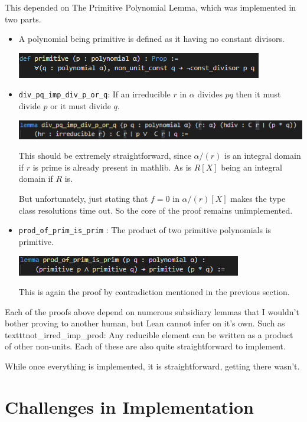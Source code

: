 \documentclass[pagesize=a4]{scrreprt}
\begin{document}
This depended on The Primitive Polynomial Lemma, which was implemented in two parts. 

\begin{itemize}
   \item A polynomial being primitive is defined as it having no constant divisors. 

   \includegraphics{def_prim.png}

   \item \texttt{div\_pq\_imp\_div\_p\_or\_q}: If an irreducible $r$ in $\alpha$ divides $pq$ then it must divide $p$ or it must divide $q$. 

    \includegraphics{div_pq.png}

    This should be extremely straightforward, since $\alpha/(r)$ is an integral domain if $r$ is prime is already present in mathlib. As is $R[X]$ being an integral domain if $R$ is.

    But unfortunately, just stating that $f = 0$ in $\alpha/(r)[X]$ makes the type class resolutions time out. So the core of the proof remains unimplemented.

    \item \texttt{prod\_of\_prim\_is\_prim} : The product of two primitive polynomials is primitive. 
    
    \includegraphics{prod_prim.png} 

    This is again the proof by contradiction mentioned in the previous section. 

\end{itemize}


Each of the proofs above depend on numerous subsidiary lemmas that I wouldn't bother proving to another human, but Lean cannot infer on it's own. Such as texttt{not\_irred\_imp\_prod}: Any reducible element can be written as a product of other non-units. Each of these are also quite straightforward to implement. 

While once everything is implemented, it is straightforward, getting there wasn't.  

\chapter{Challenges in Implementation}
\end{document}
